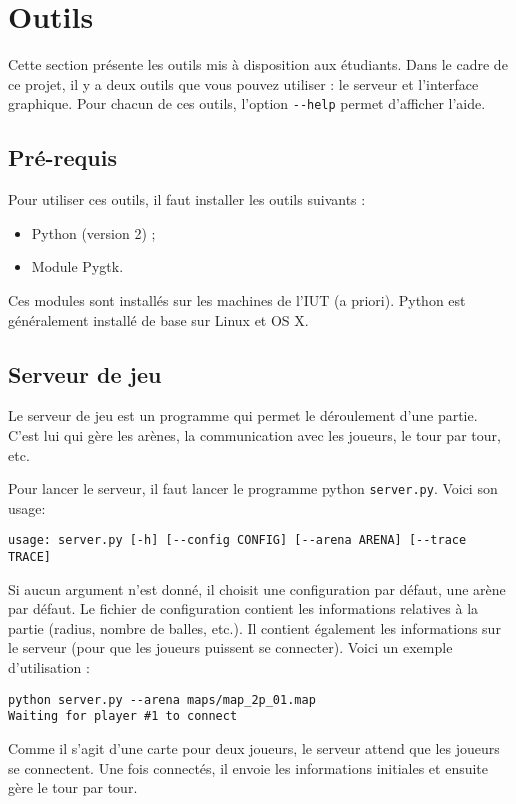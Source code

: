 \section{Outils} %
\label{outils}

Cette section présente les outils mis à disposition aux étudiants.
Dans le cadre de ce projet, il y a deux outils que vous pouvez utiliser : le serveur et l'interface graphique.
Pour chacun de ces outils, l'option \lstinline!--help! permet d'afficher l'aide.

\subsection{Pré-requis} %
Pour utiliser ces outils, il faut installer les outils suivants :
\begin{itemize}
    \item Python (version 2) ;
    \item Module Pygtk.
\end{itemize}

Ces modules sont installés sur les machines de l'IUT (a priori).
Python est généralement installé de base sur Linux et OS X.

\subsection{Serveur de jeu} %
Le serveur de jeu est un programme qui permet le déroulement d'une partie.
C'est lui qui gère les arènes, la communication avec les joueurs, le tour par tour, etc.

Pour lancer le serveur, il faut lancer le programme python \lstinline!server.py!.
Voici son usage: 
\begin{lstlisting}
usage: server.py [-h] [--config CONFIG] [--arena ARENA] [--trace TRACE]
\end{lstlisting}

Si aucun argument n'est donné, il choisit une configuration par défaut, une arène par défaut.
Le fichier de configuration contient les informations relatives à la partie (radius, nombre de balles, etc.).
Il contient également les informations sur le serveur (pour que les joueurs puissent se connecter).
Voici un exemple d'utilisation :
\begin{lstlisting}
python server.py --arena maps/map_2p_01.map 
Waiting for player #1 to connect 
\end{lstlisting}

Comme il s'agit d'une carte pour deux joueurs, le serveur attend que les joueurs se connectent.
Une fois connectés, il envoie les informations initiales et ensuite gère le tour par tour.

